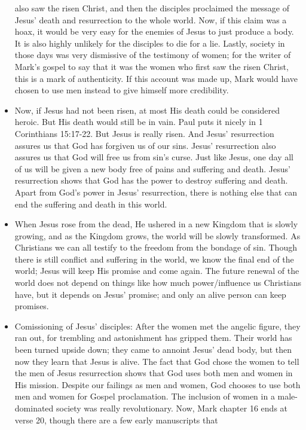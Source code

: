 \begin{itemize}
{  also saw the risen Christ, and then the disciples proclaimed the message of
  Jesus' death and resurrection to the whole world.  Now, if this claim was a
  hoax, it would be very easy for the enemies of Jesus to just produce a
  body.  It is also highly unlikely for the disciples to die for a lie.
  Lastly, society in those days was very dismissive of the testimony of
  women; for the writer of Mark's gospel to say that it was the women who
  first saw the risen Christ, this is a mark of authenticity.  If this
  account was made up, Mark would have chosen to use men instead to give
  himself more credibility.}
  \item{Now, if Jesus had not been risen, at most His death could be
  considered heroic.  But His death would still be in vain.  Paul puts it
  nicely in 1 Corinthians 15:17-22.  But Jesus is really risen.  And Jesus'
  resurrection assures us that God has forgiven us of our sins.  Jesus'
  resurrection also assures us that God will free us from sin's curse.  Just
  like Jesus, one day all of us will be given a new body free of pains and
  suffering and death.  Jesus' resurrection shows that God has the power to
  destroy suffering and death.  Apart from God's power in Jesus'
  resurrection, there is nothing else that can end the suffering and death in
  this world. }
  \item{When Jesus rose from the dead, He ushered in a new Kingdom that is
  slowly growing, and as the Kingdom grows, the world will be slowly
  transformed.  As Christians we can all testify to the freedom from the
  bondage of sin.  Though there is still conflict and suffering in the world,
  we know the final end of the world; Jesus will keep His promise and come
  again.  The future renewal of the world does not depend on things like how
  much power/influence us Christians have, but it depends on Jesus' promise;
  and only an alive person can keep promises.}
  \item{Comissioning of Jesus' disciples: After the women met the angelic
  figure, they ran out, for trembling and astonishment has gripped them.
  Their world has been turned upside down; they came to annoint Jesus' dead
  body, but then now they learn that Jesus is alive.  The fact that God chose
  the women to tell the men of Jesus resurrection shows that God uses both
  men and women in His mission.  Despite our failings as men and women, God
  chooses to use both men and women for Gospel proclamation.  The inclusion
  of women in a male-dominated society was really revolutionary.  Now, Mark
  chapter 16 ends at verse 20, though there are a few early manuscripts that
}
\end{itemize}
